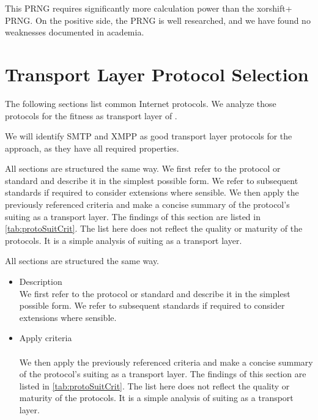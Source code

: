 This PRNG requires significantly more calculation power than the xorshift+ PRNG. On the positive side, the PRNG is well researched, and we have found no weaknesses documented in academia.


\section{Transport Layer Protocol Selection}\label{sec:transportProtocols}
The following sections list common Internet protocols. We analyze those protocols for the fitness as transport layer of \MessageVortex. 

We will identify SMTP and XMPP as good transport layer protocols for the \MessageVortex{} approach, as they have all required properties.

All sections are structured the same way. We first refer to the protocol or standard and describe it in the simplest possible form. We refer to subsequent standards if required to consider extensions where sensible. We then apply the previously referenced criteria and make a concise summary of the protocol's suiting as a transport layer. The findings of this section are listed in \cref{tab:protoSuitCrit}. The list here does not reflect the quality or maturity of the protocols. It is a simple analysis of suiting as a transport layer.

All sections are structured the same way. 
\begin{itemize}
	\item Description\\
	We first refer to the protocol or standard and describe it in the simplest possible form. We refer to subsequent standards if required to consider extensions where sensible.
	\item Apply criteria\\\\
	We then apply the previously referenced criteria and make a concise summary of the protocol's suiting as a transport layer. The findings of this section are listed in \cref{tab:protoSuitCrit}. The list here does not reflect the quality or maturity of the protocols. It is a simple analysis of suiting as a transport layer.
\end{itemize} 

